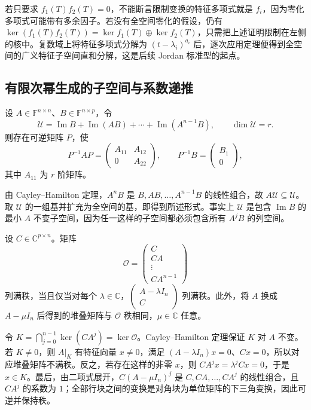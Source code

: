 若只要求 $f_1(T)f_2(T)=0$，不能断言限制变换的特征多项式就是 $f_i$，因为零化多项式可能带有多余因子。若没有全空间零化的假设，仍有 $\ker(f_1(T)f_2(T))=\ker f_1(T)\oplus\ker f_2(T)$，只需把上述证明限制在左侧的核中。复数域上将特征多项式分解为 $(t-\lambda_i)^{a_i}$ 后，逐次应用定理便得到全空间的广义特征子空间直和分解，这是后续 Jordan 标准型的起点。

\subsection{有限次幂生成的子空间与系数递推}

\begin{example}
设 $A\in\mathbb F^{n\times n}$、$B\in\mathbb F^{n\times p}$，令
\[
\mathcal U=\operatorname{Im}B+\operatorname{Im}(AB)+\cdots+
\operatorname{Im}(A^{n-1}B),\qquad \dim\mathcal U=r.
\]
则存在可逆矩阵 $P$，使
\[
P^{-1}AP=\begin{pmatrix}A_{11}&A_{12}\\0&A_{22}\end{pmatrix},\qquad
P^{-1}B=\begin{pmatrix}B_1\\0\end{pmatrix},
\]
其中 $A_{11}$ 为 $r$ 阶矩阵。
\end{example}
\begin{solve}
由 Cayley--Hamilton 定理，$A^nB$ 是 $B,AB,\ldots,A^{n-1}B$ 的线性组合，故 $A\mathcal U\subseteq\mathcal U$。取 $\mathcal U$ 的一组基并扩充为全空间的基，即得到所述形式。事实上 $\mathcal U$ 是包含 $\operatorname{Im}B$ 的最小 $A$ 不变子空间，因为任一这样的子空间都必须包含所有 $A^jB$ 的列空间。
\end{solve}

\begin{example}
设 $C\in\mathbb C^{p\times n}$。矩阵
\[
\mathcal O=\begin{pmatrix}C\\CA\\\vdots\\CA^{n-1}\end{pmatrix}
\]
列满秩，当且仅当对每个 $\lambda\in\mathbb C$，$\begin{pmatrix}A-\lambda I_n\\C\end{pmatrix}$ 列满秩。此外，将 $A$ 换成 $A-\mu I_n$ 后得到的堆叠矩阵与 $\mathcal O$ 秩相同，$\mu\in\mathbb C$ 任意。
\end{example}
\begin{solve}
令 $K=\bigcap_{j=0}^{n-1}\ker(CA^j)=\ker\mathcal O$。Cayley--Hamilton 定理保证 $K$ 对 $A$ 不变。若 $K\ne0$，则 $A|_K$ 有特征向量 $x\ne0$，满足 $(A-\lambda I_n)x=0$、$Cx=0$，所以对应堆叠矩阵不满秩。反之，若存在这样的非零 $x$，则 $CA^jx=\lambda^jCx=0$，于是 $x\in K$。最后，由二项式展开，$C(A-\mu I_n)^j$ 是 $C,CA,\ldots,CA^j$ 的线性组合，且 $CA^j$ 的系数为 $1$；全部行块之间的变换是对角块为单位矩阵的下三角变换，因此可逆并保持秩。
\end{solve}

